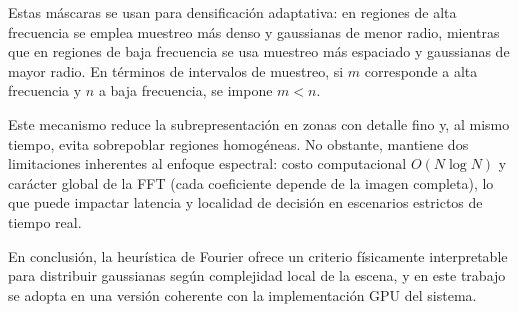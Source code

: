 Estas máscaras se usan para densificación adaptativa: en regiones de alta frecuencia se emplea muestreo más denso y gaussianas de menor radio, mientras que en regiones de baja frecuencia se usa muestreo más espaciado y gaussianas de mayor radio. En términos de intervalos de muestreo, si $m$ corresponde a alta frecuencia y $n$ a baja frecuencia, se impone $m<n$.

Este mecanismo reduce la subrepresentación en zonas con detalle fino y, al mismo tiempo, evita sobrepoblar regiones homogéneas. No obstante, mantiene dos limitaciones inherentes al enfoque espectral: costo computacional $O(N\log N)$ y carácter global de la FFT (cada coeficiente depende de la imagen completa), lo que puede impactar latencia y localidad de decisión en escenarios estrictos de tiempo real.

En conclusión, la heurística de Fourier ofrece un criterio físicamente interpretable para distribuir gaussianas según complejidad local de la escena, y en este trabajo se adopta en una versión coherente con la implementación GPU del sistema.
